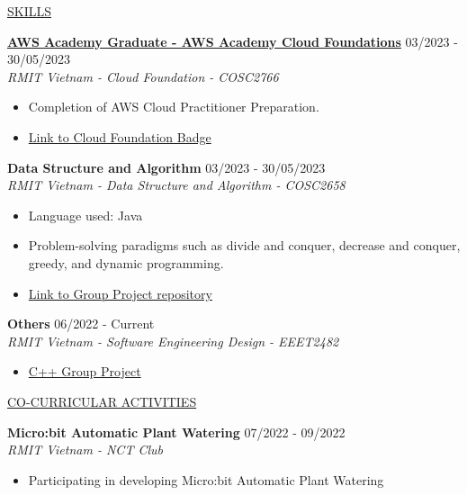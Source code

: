 \documentclass[11pt]{article}
\newcommand{\betteruline}[1]{
    \uline{#1}
}
\newcommand{\sectiontitle}[1]{
    \begingroup
        \titlebold
        \betteruline{\Large\uppercase{#1}  }
        \vspace{1.7mm}
    \endgroup
}
\newcommand{\sectioncontent}[1]{
    \begingroup
        \begin{FlushLeft}
        \vspace{-3mm}
        \sffamily\small#1
        \end{FlushLeft}
    \endgroup
    \vspace{2mm}
}
\newcommand{\project}[2]{
    \begingroup
        \textbf{\small#1}
        \hfill\color{black!70}\small{#2}
    \endgroup
}
\newcommand{\spacevv}{
    \vspace{2mm}
}
\begin{document}
\begin{paracol}{2}
    \sectiontitle{Skills}
    \sectioncontent{
    \vspace{1mm}
        \project{\href{https://www.credly.com/badges/20c053cd-785a-4100-bc79-bd1c902d5c28/public_url}{AWS Academy Graduate - AWS Academy Cloud Foundations}}{03/2023 - 30/05/2023} \\
    \vspace{1mm}
        \textcolor{black!70}{\textit{RMIT Vietnam - Cloud Foundation - COSC2766}}
        \vspace{1mm}
        \begin{itemize}
            \item  Completion of AWS Cloud Practitioner Preparation.
\vspace{1mm} 
            \item \href{https://www.credly.com/badges/20c053cd-785a-4100-bc79-bd1c902d5c28/public_url}{Link to Cloud Foundation Badge}
        \end{itemize}
        \spacevv

       \project{Data Structure and Algorithm}{03/2023 - 30/05/2023} \\
    \vspace{1mm}
        \textcolor{black!70}{\textit{RMIT Vietnam - Data Structure and Algorithm - COSC2658}}
        \vspace{1mm}
        \begin{itemize}
        \item Language used: Java
\vspace{1mm} 
\item Problem-solving paradigms such as divide and conquer, decrease and conquer, greedy, and dynamic programming.
\vspace{1mm} 
            \item \href{https://github.com/miketvo/rmit2023a-cosc2658-group-project}{Link to Group Project repository}
        \end{itemize}
        \spacevv
       
        \project{Others}{06/2022 - Current} \\
        \textcolor{black!70}{\textit{RMIT Vietnam - Software Engineering Design - EEET2482}}
        \begin{itemize}
            \item  \href{https://github.com/miketvo/rmit2022c-eeet2482-lodging-app}{C++ Group Project}
        \end{itemize}
        \spacevv
    }

    \sectiontitle{CO-CURRICULAR ACTIVITIES}
    \sectioncontent{
    \vspace{1mm} 
          \project{Micro:bit Automatic Plant Watering}{07/2022 - 09/2022} \\
          \textcolor{black!70}{\textit{RMIT Vietnam - NCT Club}}
          \vspace{1mm} 
          \begin{itemize}
            \item Participating in developing Micro:bit Automatic Plant Watering
          \end{itemize}
          \spacevv
        
}
\end{paracol}
\end{document}
